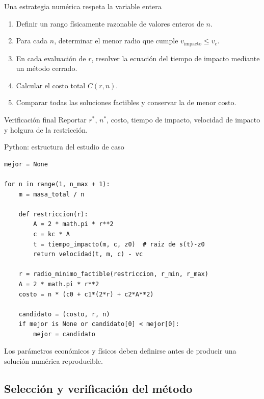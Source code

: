 \documentclass[../../main.tex]{subfiles}
\begin{document}
\begin{frame}{Una estrategia numérica respeta la variable entera}
\begin{enumerate}
  \item Definir un rango físicamente razonable de valores enteros de $n$.
  \item Para cada $n$, determinar el menor radio que cumple $v_{\mathrm{impacto}}\le v_c$.
  \item En cada evaluación de $r$, resolver la ecuación del tiempo de impacto mediante un método cerrado.
  \item Calcular el costo total $C(r,n)$.
  \item Comparar todas las soluciones factibles y conservar la de menor costo.
\end{enumerate}

\begin{block}{Verificación final}
Reportar $r^*$, $n^*$, costo, tiempo de impacto, velocidad de impacto y holgura de la restricción.
\end{block}
\end{frame}

\begin{frame}[fragile]{Python: estructura del estudio de caso}
\scriptsize
\begin{lstlisting}[style=mypython]
mejor = None

for n in range(1, n_max + 1):
    m = masa_total / n

    def restriccion(r):
        A = 2 * math.pi * r**2
        c = kc * A
        t = tiempo_impacto(m, c, z0)  # raiz de s(t)-z0
        return velocidad(t, m, c) - vc

    r = radio_minimo_factible(restriccion, r_min, r_max)
    A = 2 * math.pi * r**2
    costo = n * (c0 + c1*(2*r) + c2*A**2)

    candidato = (costo, r, n)
    if mejor is None or candidato[0] < mejor[0]:
        mejor = candidato
\end{lstlisting}

Los parámetros económicos y físicos deben definirse antes de producir una solución numérica reproducible.
\end{frame}


\subsection{Selección y verificación del método}
\end{document}

